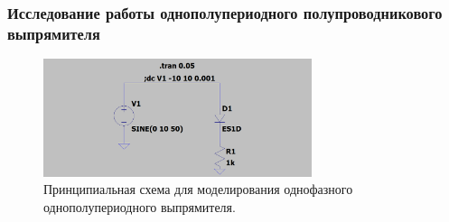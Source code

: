 \documentclass[12pt]{article}
\begin{document}
\subsubsection*{Исследование работы однополупериодного полупроводникового выпрямителя}
\begin{figure}[H]
    \centering
    \includegraphics[width=0.7\textwidth]{2_1_circuits_scheme.png}
    \caption{Принципиальная схема для моделирования однофазного однополупериодного выпрямителя.}
    \label{fig:2_1_circuits_scheme.png}
\end{figure}\\
\end{document}
